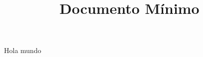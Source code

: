 \documentclass[a4paper, 11pt]{article}
\title{Documento Mínimo}
\begin{document}
\maketitle

Hola mundo
\end{document}
